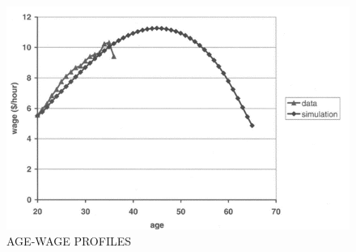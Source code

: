 \hypertarget{HCprodfuncAgeWageProfiles}{}
\begin{figure}[tbp]
  \centerline{\includegraphics[width=6in]{../FigDir/Figure3.png}}
  \caption{AGE-WAGE PROFILES}
  \label{fig:AgeWageProfiles}
\end{figure}

